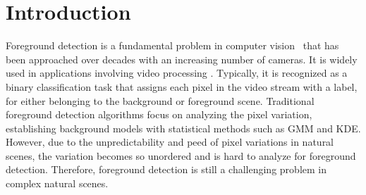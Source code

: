 \documentclass[journal]{IEEEtran}
\begin{document}
\IEEEpeerreviewmaketitle

\section{Introduction}
Foreground detection is a fundamental problem in computer vision\ \cite{Bouwmans201431} that has been approached over decades with an increasing number of cameras.
It is widely used in applications involving video processing \cite{Barnich2011_2011_TIP}.
Typically, it is recognized as a binary classification task that assigns each pixel in the video stream with a label, 
for either belonging to the background or foreground scene.
Traditional foreground detection algorithms focus on analyzing the pixel variation, establishing background models with statistical methods such as GMM\cite{Stauffer1999}\cite{lee2005} and KDE\cite{Elgammal2000Non}\cite{Mittal2004KDE}.
However, due to the unpredictability and peed of pixel variations in natural scenes,
the variation becomes so unordered and is hard to analyze for foreground detection.
Therefore, foreground detection is still a challenging problem in complex natural scenes.
%
%

\end{document}
